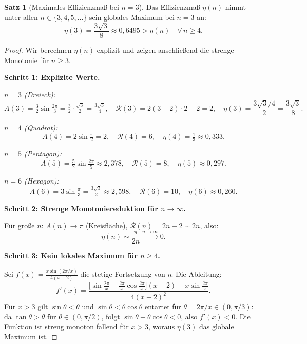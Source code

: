 ﻿\documentclass[a4paper,12pt]{article}
\theoremstyle{definition}
\newtheorem{satz}{Satz}[section]
\begin{document}
\begin{satz}[Maximales Effizienzma\ss{} bei $n = 3$]
\label{satz:eta_max}
Das Effizienzma\ss{} $\eta(n)$ nimmt unter allen $n \in \{3, 4, 5, \ldots\}$
sein globales Maximum bei $n = 3$ an:
\[
	\eta(3) = \frac{3\sqrt{3}}{8} \approx 0{,}6495
	> \eta(n) \quad \forall\, n \geq 4.
\]
\end{satz}

\begin{proof}
Wir berechnen $\eta(n)$ explizit und zeigen anschlie\ss{}end die strenge
Monotonie f\"ur $n \geq 3$.

\medskip
\textbf{Schritt 1: Explizite Werte.}

\noindent\textit{$n = 3$ (Dreieck):}
\[
	A(3) = \tfrac{3}{2}\sin\!\tfrac{2\pi}{3} = \tfrac{3}{2}\cdot\tfrac{\sqrt{3}}{2}
	= \tfrac{3\sqrt{3}}{4}, \quad
	\mathcal{R}(3) = 2(3-2) \cdot 2 - 2 = 2, \quad
	\eta(3) = \frac{3\sqrt{3}/4}{2} = \frac{3\sqrt{3}}{8}.
\]

\noindent\textit{$n = 4$ (Quadrat):}
\[
	A(4) = 2\sin\!\tfrac{\pi}{2} = 2, \quad
	\mathcal{R}(4) = 6, \quad
	\eta(4) = \tfrac{1}{3} \approx 0{,}333.
\]

\noindent\textit{$n = 5$ (Pentagon):}
\[
	A(5) = \tfrac{5}{2}\sin\!\tfrac{2\pi}{5} \approx 2{,}378, \quad
	\mathcal{R}(5) = 8, \quad
	\eta(5) \approx 0{,}297.
\]

\noindent\textit{$n = 6$ (Hexagon):}
\[
	A(6) = 3\sin\!\tfrac{\pi}{3} = \tfrac{3\sqrt{3}}{2} \approx 2{,}598, \quad
	\mathcal{R}(6) = 10, \quad
	\eta(6) \approx 0{,}260.
\]

\medskip
\textbf{Schritt 2: Strenge Monotoniereduktion f\"ur $n \to \infty$.}

F\"ur gro\ss{}e $n$: $A(n) \to \pi$ (Kreisfl\"ache), $\mathcal{R}(n) = 2n - 2 \sim 2n$,
also:
\[
	\eta(n) \sim \frac{\pi}{2n} \xrightarrow{n \to \infty} 0.
\]

\medskip
\textbf{Schritt 3: Kein lokales Maximum f\"ur $n \geq 4$.}

Sei $f(x) = \frac{x\sin(2\pi/x)}{4(x-2)}$ die stetige Fortsetzung von $\eta$.
Die Ableitung:
\[
	f'(x) = \frac{\bigl[\sin\tfrac{2\pi}{x} - \tfrac{2\pi}{x}\cos\tfrac{2\pi}{x}\bigr](x-2)
	             - x\sin\tfrac{2\pi}{x}}{4(x-2)^2}.
\]
F\"ur $x > 3$ gilt $\sin\theta < \theta$ und $\sin\theta < \theta\cos\theta$ entartet
f\"ur $\theta = 2\pi/x \in (0, \pi/3)$: da $\tan\theta > \theta$ f\"ur $\theta \in (0,\pi/2)$,
folgt $\sin\theta - \theta\cos\theta < 0$, also $f'(x) < 0$. Die Funktion ist
streng monoton fallend f\"ur $x > 3$, woraus $\eta(3)$ das globale Maximum ist.
\end{proof}
\end{document}
